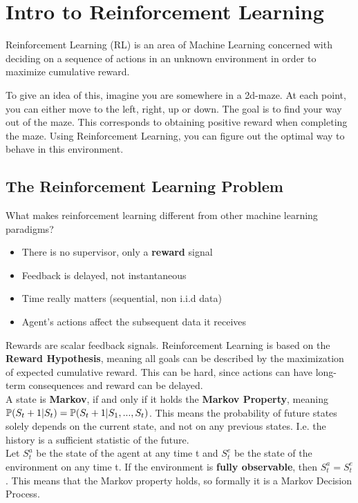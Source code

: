\chapter{Intro to Reinforcement Learning}

Reinforcement Learning (RL) is an area of Machine Learning concerned with deciding on a sequence of actions in an unknown environment in order to maximize cumulative reward.

To give an idea of this, imagine you are somewhere in a 2d-maze. At each point, you can either move to the left, right, up or down. The goal is to find your way out of the maze. This corresponds to obtaining positive reward when completing the maze. Using Reinforcement Learning, you can figure out the optimal way to behave in this environment.

\section{The Reinforcement Learning Problem}

What makes reinforcement learning different from other machine learning paradigms?
\begin{itemize}
	\item There is no supervisor, only a \textbf{reward} signal
	\item Feedback is delayed, not instantaneous
	\item Time really matters (sequential, non i.i.d data)
	\item Agent's actions affect the subsequent data it receives
\end{itemize}

Rewards are scalar feedback signals. Reinforcement Learning is based on the \textbf{Reward Hypothesis}, meaning all goals can be described by the maximization of expected
cumulative reward. This can be hard, since actions can have long-term consequences and reward can be delayed.\\

A state is \textbf{Markov}, if and only if it holds the \textbf{Markov Property}, meaning $\operatorname{\mathbb{P}}(S_t+1 | S_t) = \operatorname{\mathbb{P}}(S_t+1 | S_1, ..., S_t)$. This means the probability of future states solely depends on the current state, and not on any previous states. I.e. the history is a sufficient statistic of the future.\\

Let $S_t^a$ be the state of the agent at any time t and $S_t^e$ be the state of the environment on any time t. If the environment is \textbf{fully observable}, then $S_t^a = S_t^e$. This means that the Markov property holds, so formally it is a Markov Decision Process.\\

